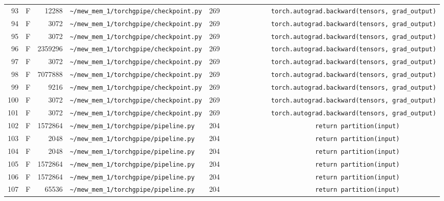 \documentclass{article}
\begin{document}
\begin{longtable}{r l r p{6.5cm} r p{7.0cm}}
93 & F & 12288 & \lstinline|~/mew_mem_1/torchgpipe/checkpoint.py| & 269 & \lstinline|            torch.autograd.backward(tensors, grad_output)| \\
94 & F & 3072 & \lstinline|~/mew_mem_1/torchgpipe/checkpoint.py| & 269 & \lstinline|            torch.autograd.backward(tensors, grad_output)| \\
95 & F & 3072 & \lstinline|~/mew_mem_1/torchgpipe/checkpoint.py| & 269 & \lstinline|            torch.autograd.backward(tensors, grad_output)| \\
96 & F & 2359296 & \lstinline|~/mew_mem_1/torchgpipe/checkpoint.py| & 269 & \lstinline|            torch.autograd.backward(tensors, grad_output)| \\
97 & F & 3072 & \lstinline|~/mew_mem_1/torchgpipe/checkpoint.py| & 269 & \lstinline|            torch.autograd.backward(tensors, grad_output)| \\
98 & F & 7077888 & \lstinline|~/mew_mem_1/torchgpipe/checkpoint.py| & 269 & \lstinline|            torch.autograd.backward(tensors, grad_output)| \\
99 & F & 9216 & \lstinline|~/mew_mem_1/torchgpipe/checkpoint.py| & 269 & \lstinline|            torch.autograd.backward(tensors, grad_output)| \\
100 & F & 3072 & \lstinline|~/mew_mem_1/torchgpipe/checkpoint.py| & 269 & \lstinline|            torch.autograd.backward(tensors, grad_output)| \\
101 & F & 3072 & \lstinline|~/mew_mem_1/torchgpipe/checkpoint.py| & 269 & \lstinline|            torch.autograd.backward(tensors, grad_output)| \\
102 & F & 1572864 & \lstinline|~/mew_mem_1/torchgpipe/pipeline.py| & 204 & \lstinline|                        return partition(input)| \\
103 & F & 2048 & \lstinline|~/mew_mem_1/torchgpipe/pipeline.py| & 204 & \lstinline|                        return partition(input)| \\
104 & F & 2048 & \lstinline|~/mew_mem_1/torchgpipe/pipeline.py| & 204 & \lstinline|                        return partition(input)| \\
105 & F & 1572864 & \lstinline|~/mew_mem_1/torchgpipe/pipeline.py| & 204 & \lstinline|                        return partition(input)| \\
106 & F & 1572864 & \lstinline|~/mew_mem_1/torchgpipe/pipeline.py| & 204 & \lstinline|                        return partition(input)| \\
107 & F & 65536 & \lstinline|~/mew_mem_1/torchgpipe/pipeline.py| & 204 & \lstinline|                        return partition(input)| \\

\end{longtable}
\end{document}
